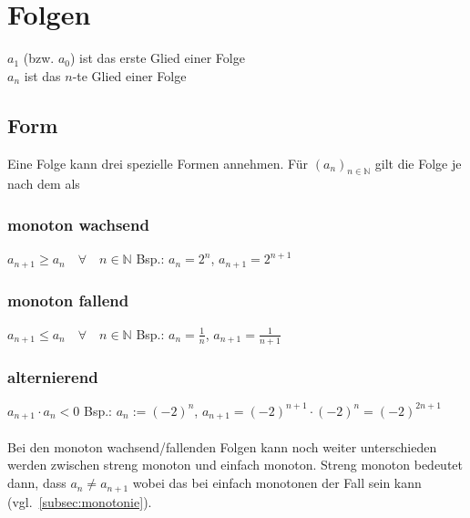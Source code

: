 




\section{Folgen}
$a_1$ (bzw. $a_0$) ist das erste Glied einer Folge\\
$a_n$ ist das $n$-te Glied einer Folge

\subsection{Form}
Eine Folge kann drei spezielle Formen annehmen. Für $(a_n)_{n \in \mathbb{N}}$ 
gilt die Folge je nach dem als
\subsubsection*{monoton wachsend}
$ \boxed{ a_{n+1} \geq a_n \quad \forall \quad n \in \mathbb{N} } $ Bsp.: $a_n 
= 2^n$, $a_{n+1} = 2^{n+1}$
\subsubsection*{monoton fallend}
$ \boxed{ a_{n+1} \leq a_n \quad \forall \quad n \in \mathbb{N} } $ Bsp.: $a_n 
= \frac{1}{n}$, $a_{n+1} = \frac{1}{n+1}$
\subsubsection*{alternierend}
$ \boxed{ a_{n+1} \cdot a_n < 0 } $ Bsp.: $a_n := (-2)^n$, $a_{n+1} 
= (-2)^{n+1} \cdot (-2)^n = (-2)^{2n+1}$\\\\
Bei den monoton wachsend/fallenden Folgen kann noch weiter unterschieden werden 
zwischen streng monoton und einfach monoton. Streng monoton bedeutet dann, dass 
$a_n \neq a_{n+1}$ wobei das bei einfach monotonen der Fall sein kann 
(vgl.~\ref{subsec:monotonie}).
